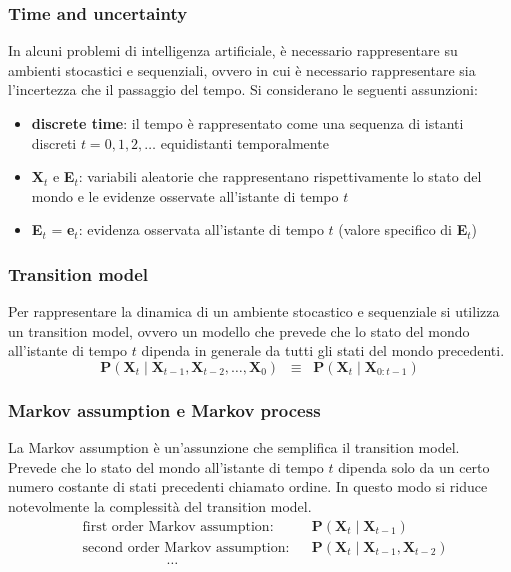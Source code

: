 \subsubsection*{Time and uncertainty}
In alcuni problemi di intelligenza artificiale, è necessario rappresentare su ambienti stocastici e sequenziali, ovvero in
cui è necessario rappresentare sia l'incertezza che il passaggio del tempo. Si considerano le seguenti assunzioni:
\begin{itemize}
	\item \textbf{discrete time}: il tempo è rappresentato come una sequenza di istanti discreti \(t = 0, 1, 2, \ldots\)
	equidistanti temporalmente
	\item \textbf{X}\(_t\) e \textbf{E}\(_t\): variabili aleatorie che rappresentano rispettivamente lo stato del mondo
	e le evidenze osservate all'istante di tempo \(t\)
	\item \textbf{E}\(_t\) = \textbf{e}\(_t\): evidenza osservata all'istante di tempo \(t\) (valore specifico di \textbf{E}\(_t\))
\end{itemize}

\subsubsection*{Transition model}
Per rappresentare la dinamica di un ambiente stocastico e sequenziale si utilizza un transition model, ovvero un modello
che prevede che lo stato del mondo all'istante di tempo \(t\) dipenda in generale da tutti gli stati del mondo precedenti.
\[\textbf{P}(\textbf{X}_t \mid \textbf{X}_{t-1}, \textbf{X}_{t-2}, \ldots, \textbf{X}_0) \;\; \equiv \;\; \textbf{P}(\textbf{X}_t \mid \textbf{X}_{0:t-1})\]

\subsubsection*{Markov assumption e Markov process}
La Markov assumption è un'assunzione che semplifica il transition model. Prevede che lo stato del mondo all'istante di tempo
\(t\) dipenda solo da un certo numero costante di stati precedenti chiamato ordine. In questo modo si riduce notevolmente
la complessità del transition model.
\begin{align*}
	&\text{first order Markov assumption}: & &\textbf{P}(\textbf{X}_t \mid \textbf{X}_{t-1}) \\
	&\text{second order Markov assumption}: & &\textbf{P}(\textbf{X}_t \mid \textbf{X}_{t-1}, \textbf{X}_{t-2}) \\
	&\qquad\qquad\qquad\dots
\end{align*}

